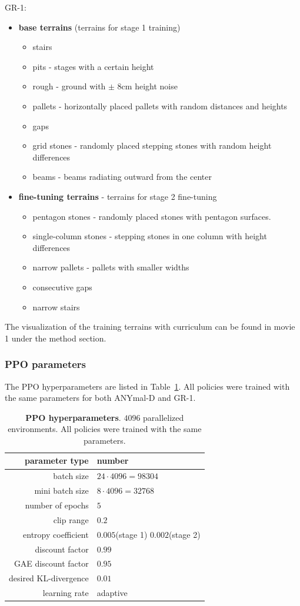 \documentclass[9pt,twocolumn,twoside]{osajnl}
\begin{document}
\noindent GR-1:
\begin{itemize}
    \item \textbf{base terrains} (terrains for stage 1 training)
    \begin{itemize}
        \item stairs
        \item pits - stages with a certain height
        \item rough - ground with $\pm$ 8cm height noise
        \item pallets - horizontally placed pallets with random distances and heights
        \item gaps
        \item grid stones - randomly placed stepping stones with random height differences
        \item beams - beams radiating outward from the center
    \end{itemize}
    \item \textbf{fine-tuning terrains} - terrains for stage 2 fine-tuning
    \begin{itemize}
        \item pentagon stones - randomly placed stones with pentagon surfaces.
        \item single-column stones - stepping stones in one column with height differences
        \item narrow pallets - pallets with smaller widths
        \item consecutive gaps
        \item narrow stairs
    \end{itemize}
\end{itemize} 
The visualization of the training terrains with curriculum can be found in movie 1 under the method section.

\subsubsection*{PPO parameters}
The PPO hyperparameters are listed in Table~\ref{tab:ppo}. All policies were trained with the same parameters for both ANYmal-D and GR-1.
\begin{table}
\centering
\caption{\textbf{PPO hyperparameters}. $4096$ parallelized environments. All policies were trained with the same parameters.}
\begin{tabular}{r|l}
parameter type & number \\ \hline 
batch size & $24 \cdot 4096 = 98304$ \\
mini batch size & $8 \cdot 4096 = 32768$ \\
number of epochs & $5$ \\
clip range & $0.2$ \\
entropy coefficient & $0.005$(stage 1) $0.002$(stage 2) \\
discount factor & $0.99$ \\
GAE discount factor & $0.95$ \\
desired KL-divergence & $0.01$ \\
learning rate & adaptive \\
\end{tabular}
\label{tab:ppo}
\end{table}
\end{document}
